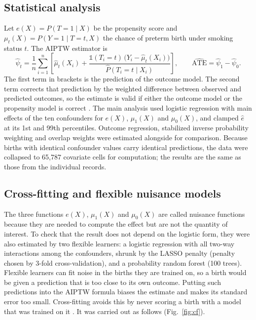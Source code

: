 \documentclass[11pt,letterpaper]{article}
\begin{document}
\subsection*{Statistical analysis}
Let $e(X)=P(T=1\mid X)$ be the propensity score and $\mu_t(X)=P(Y=1\mid T=t,X)$ the chance of preterm birth under smoking status $t$. The AIPTW estimator is
\begin{equation}
\hat\psi_t=\frac1n\sum_{i=1}^{n}\left[\hat\mu_t(X_i)+\frac{\mathbb{1}(T_i=t)\,\big(Y_i-\hat\mu_t(X_i)\big)}{\hat P(T_i=t\mid X_i)}\right],\qquad \widehat{\mathrm{ATE}}=\hat\psi_1-\hat\psi_0 .
\end{equation}
The first term in brackets is the prediction of the outcome model. The second term corrects that prediction by the weighted difference between observed and predicted outcomes, so the estimate is valid if either the outcome model or the propensity model is correct \cite{bang2005,funk2011}. The main analysis used logistic regression with main effects of the ten confounders for $e(X)$, $\mu_1(X)$ and $\mu_0(X)$, and clamped $\hat e$ at its 1st and 99th percentiles. Outcome regression, stabilized inverse probability weighting and overlap weights \cite{li2018} were estimated alongside for comparison. Because births with identical confounder values carry identical predictions, the data were collapsed to 65,787 covariate cells for computation; the results are the same as those from the individual records.

\subsection*{Cross-fitting and flexible nuisance models}
The three functions $e(X)$, $\mu_1(X)$ and $\mu_0(X)$ are called nuisance functions because they are needed to compute the effect but are not the quantity of interest. To check that the result does not depend on the logistic form, they were also estimated by two flexible learners: a logistic regression with all two-way interactions among the confounders, shrunk by the LASSO penalty (penalty chosen by 3-fold cross-validation), and a probability random forest (100 trees). Flexible learners can fit noise in the births they are trained on, so a birth would be given a prediction that is too close to its own outcome. Putting such predictions into the AIPTW formula biases the estimate and makes its standard error too small. Cross-fitting avoids this by never scoring a birth with a model that was trained on it \cite{chern2018,zivich2021}. It was carried out as follows (Fig.~\ref{fig:cf}).
\end{document}
